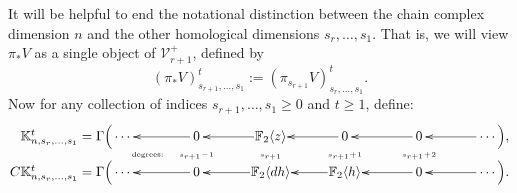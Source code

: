 \documentclass[11pt]{amsart}
\theoremstyle{plain}
\theoremstyle{definition}
\newcommand{\calV}{\mathcal{V}}
\theoremstyle{plain}
\newcommand{\vect}[2]{\calV^{#1}_{#2}}
\newcommand{\F}{\mathbb{F}}
\newcommand{\complexes}{\textup{ch}_+}
\begin{document}
\begin{Conventions and notation}
It will be helpful to end the notational distinction between the chain complex dimension $n$ and the other homological dimensions $s_r,\ldots,s_1$. That is, we will view $\pi_*V$ as a single object of $\vect{+}{r+1}$, defined by
\[(\pi_*V)^t_{s_{r+1},\ldots,s_1}:=(\pi_{s_{r+1}}V)^t_{s_{r},\ldots,s_1}.\]
Now for any collection of indices $s_{r+1},\ldots,s_1\geq0$ and $t\geq1$, define:
\begin{gather*}
\phantom{C\mathbb{K}_{n,s_r,\ldots,s_1}^t=\Gamma\Bigl(}\xymatrix@R=0mm@1@!C{
{\makebox[0cm][r]{$\,\mathbb{K}_{n,s_r,\ldots,s_1}^t=\Gamma\Bigl($}\cdots\,} &%
{\,0\,}\ar[l]
&%
\F_2\langle z\rangle\ar[l]
&%
{\,0\,}\ar[l]
&{\,0\,}\ar[l]
&{\,\cdots\Bigr),} \ar[l]
\\
&\raisebox{.4mm}{\tiny\makebox[0cm][r]{degrees:\ \ \ \ \ }$\smash{s_{r+1}\!-\!1}$}
&\raisebox{.4mm}{\tiny$\smash{s_{r+1}  }$}
&\raisebox{.4mm}{\tiny$\smash{s_{r+1}\!+\!1}$}
&\raisebox{.4mm}{\tiny$\smash{s_{r+1}\!+\!2}$}\\
{\makebox[0cm][r]{$\,C\mathbb{K}_{n,s_r,\ldots,s_1}^t=\Gamma\Bigl($}\cdots\,} &%
{\,0\,}\ar[l]
&%
\F_2\langle dh\rangle\ar[l]
&%
\F_2\langle h\rangle\ar[l]
&{\,0\,}\ar[l]
&{\,\cdots\Bigr).} \ar[l]
}
\end{gather*}
\end{Conventions and notation}
\end{document}
